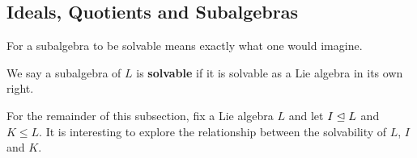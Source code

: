 \subsection{Ideals, Quotients and Subalgebras}

For a subalgebra to be solvable means exactly what one would imagine.

\begin{boxdefinition}
    We say a subalgebra of $L$ is \textbf{solvable} if it is solvable as a Lie algebra in its own right.
\end{boxdefinition}

For the remainder of this subsection, fix a Lie algebra $L$ and let $I \trianglelefteq L$ and $K \leq L$. It is interesting to explore the relationship between the solvability of $L$, $I$ and $K$.

